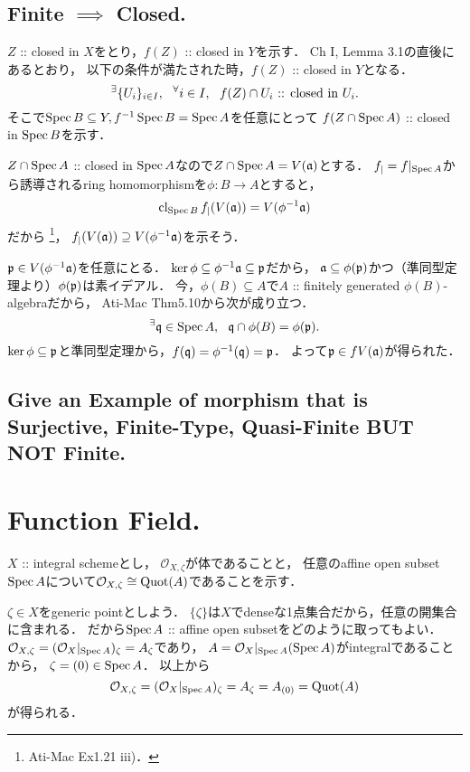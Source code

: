 \documentclass[a4paper]{jsarticle}
\newcommand{\shO}{\mathcal{O}}
\begin{document}
    \subsection{Finite $\implies$ Closed.}
    $Z$ :: closed in $X$をとり，$f(Z)$ :: closed in $Y$を示す．
    Ch I, Lemma 3.1の直後にあるとおり，
    以下の条件が満たされた時，$f(Z)$ :: closed in $Y$となる．
    \[ {}^{\exists} \{U_i\}_{i \in I},~~ {}^{\forall} i \in I,~~ f(Z) \cap U_i\text{ :: closed in }U_i. \]
    そこで$\operatorname{Spec} B \subseteq Y, f^{-1}\operatorname{Spec} B=\operatorname{Spec} A$を任意にとって
    $f(Z \cap \operatorname{Spec} A)$ :: closed in $\operatorname{Spec} B$を示す．

    $Z \cap \operatorname{Spec} A$ :: closed in $\operatorname{Spec} A$なので$Z \cap \operatorname{Spec} A=V(\mathfrak{a})$とする．
    $f_|=f|_{\operatorname{Spec} A}$から誘導されるring homomorphismを$\phi: B \to A$とすると，
    \[ \operatorname{cl}_{\operatorname{Spec} B}f_|(V(\mathfrak{a}))=V(\phi^{-1}\mathfrak{a}) \]だから
    \footnote{Ati-Mac Ex1.21 iii)．}，
    $f_|(V(\mathfrak{a})) \supseteq V(\phi^{-1}\mathfrak{a})$を示そう．
    
    $\mathfrak{p} \in V(\phi^{-1}\mathfrak{a})$を任意にとる．
    $\ker \phi \subseteq \phi^{-1}\mathfrak{a} \subseteq \mathfrak{p}$だから，
    $\mathfrak{a} \subseteq \phi(\mathfrak{p})$かつ（準同型定理より）$\phi(\mathfrak{p})$は素イデアル．
    今，$\phi(B) \subseteq A$で$A$ :: finitely generated $\phi(B)$-algebraだから，
    Ati-Mac Thm5.10から次が成り立つ．
    \[ {}^{\exists} \mathfrak{q} \in \operatorname{Spec} A,~~ \mathfrak{q} \cap \phi(B)=\phi(\mathfrak{p}). \]
    $\ker \phi \subseteq \mathfrak{p}$と準同型定理から，$f(\mathfrak{q})=\phi^{-1}(\mathfrak{q})=\mathfrak{p}$．
    よって$\mathfrak{p} \in fV(\mathfrak{a})$が得られた．

    \subsection{Give an Example of morphism that is Surjective, Finite-Type, Quasi-Finite BUT NOT Finite.}

\section{Function Field.} %
    $X$ :: integral schemeとし，
    $\shO_{X, \zeta}$が体であることと，
    任意のaffine open subset $\operatorname{Spec} A$について$\shO_{X, \zeta} \cong \Quot(A)$であることを示す．

    $\zeta \in X$をgeneric pointとしよう．
    $\{\zeta\}$は$X$でdenseな1点集合だから，任意の開集合に含まれる．
    だから$\operatorname{Spec} A$ :: affine open subsetをどのように取ってもよい．
    $\shO_{X,\zeta}=(\shO_X|_{\Spec A})_{\zeta}=A_{\zeta}$であり，
    $A=\shO_X|_{\Spec A}(\Spec A)$がintegralであることから，
    $\zeta=(0) \in \operatorname{Spec} A$．
    以上から
    \[ \shO_{X,\zeta}=(\shO_X|_{\Spec A})_{\zeta}=A_{\zeta}=A_{(0)}=\Quot(A) \]
    が得られる．
\end{document}
